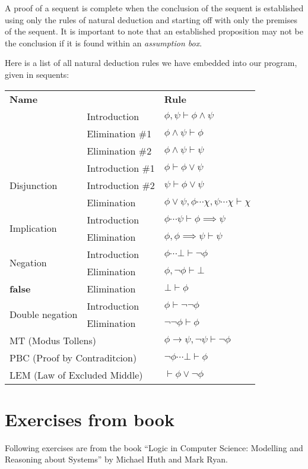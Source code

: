 \documentclass{article}
\newcommand{\imp}{\ensuremath{\rightarrow}}
\newcommand{\false}{\textbf{false}}
\begin{document}
A proof of a sequent is complete when the conclusion of the
sequent is established using only the rules of natural deduction and
starting off with only the premises of the sequent. It is important to
note that an established proposition may not be the conclusion if it is
found within an \textit{assumption box}.

Here is a list of all natural deduction rules we have embedded into
our program, given in sequents:

\begin{center}
	\renewcommand{\arraystretch}{1.4}
	\newcommand{\nl}{\\[2pt]}
	\newcommand{\nll}{\\[2pt]\hline}
	\begin{tabular}{l l|l}
		\multicolumn{2}{l|}{\textbf{Name}} & \textbf{Rule}\\\hhline{==|=}
		\multirow{3}{*}{Conjunction}
		& Introduction    & $\phi, \psi \vdash \phi \land \psi$\nl
		& Elimination \#1 & $\phi \land \psi \vdash \phi$\nl
		& Elimination \#2 & $\phi \land \psi \vdash \psi$\nll
		\multirow{3}{*}{Disjunction}
		& Introduction \#1 & $\phi \vdash \phi \lor \psi$\nl
		& Introduction \#2 & $\psi \vdash \phi \lor \psi$\nl
		& Elimination      & $\phi \lor \psi, \boxed{\phi \dotsb \chi},
			\boxed{\psi \dotsb \chi} \vdash \chi$\nll
		\multirow{2}{*}{Implication}
		& Introduction & $\boxed{\phi \dotsb \psi} \vdash \phi \implies \psi$\nl
		& Elimination  & $\phi, \phi \implies \psi \vdash \psi$\nll
		\multirow{2}{*}{Negation}
		& Introduction & $\boxed{\phi \dotsb \bot} \vdash \neg\phi$\nl
		& Elimination  & $\phi, \neg\phi \vdash \bot$\nll
		\multirow{1}{*}{\false{}}
		& Elimination  & $\bot \vdash \phi$\nll
		\multirow{2}{*}{Double negation}
		& Introduction & $\phi \vdash \neg\neg\phi$\nl
		& Elimination  & $\neg\neg\phi \vdash \phi$\nll
		\multicolumn{2}{l|}{MT (Modus Tollens)}
		& $\phi \imp \psi, \neg\psi \vdash \neg\phi$\nll
		\multicolumn{2}{l|}{PBC (Proof by Contraditcion)}
		& $\boxed{\neg\phi \dotsb \bot} \vdash \phi$\nll
		\multicolumn{2}{l|}{LEM (Law of Excluded Middle)}
		& $\vdash \phi \lor \neg\phi$
	\end{tabular}
\end{center}

\section{Exercises from book}
Following exercises are from the book ``Logic in Computer Science:
Modelling and Reasoning about Systems'' by Michael Huth and Mark Ryan.
\end{document}
